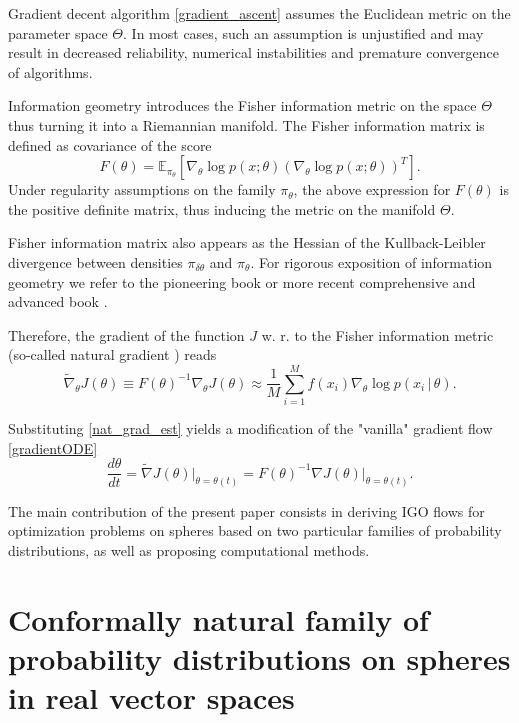 \documentclass{article}
\theoremstyle{plain}%
\theoremstyle{definition}
\theoremstyle{remark}
\theoremstyle{prop}
\begin{document}
Gradient decent algorithm \eqref{gradient_ascent} assumes the Euclidean metric on the parameter space $\Theta$. In most cases, such an assumption is unjustified and may result in decreased reliability, numerical instabilities and premature convergence of algorithms.

Information geometry introduces the Fisher information metric on the space $\Theta$ thus turning it into a Riemannian manifold. The Fisher information matrix is defined as covariance of the score 
$$
F(\theta) = \mathbb{E}_{\pi_\theta} \left[ \nabla_\theta \log p(x;\theta) (\nabla_\theta \log p(x;\theta))^T \right].
$$
Under regularity assumptions on the family $\pi_\theta$, the above expression for $F(\theta)$ is the positive definite matrix, thus inducing the metric on the manifold $\Theta$. 

Fisher information matrix also appears as the Hessian of the Kullback-Leibler divergence between densities $\pi_{\delta \theta}$ and $\pi_\theta$. For rigorous exposition of information geometry we refer to the pioneering book \cite{AN} or more recent comprehensive and advanced book \cite{AJLS}.

Therefore, the gradient of the function $J$ w. r. to the Fisher information metric (so-called natural gradient \cite{AN,AJLS}) reads
\begin{equation}
\label{nat_grad_est}
\tilde \nabla_\theta J(\theta) \equiv F(\theta)^{-1} \nabla_\theta J(\theta) \approx \frac{1}{M} \sum_{i=1}^M f(x_i) \nabla_\theta \log p(x_i \, | \, \theta).
\end{equation}

Substituting \eqref{nat_grad_est} yields a modification of the "vanilla" gradient flow \eqref{gradientODE}
\begin{equation}
\label{nat_gradientODE}
\frac{d \theta}{dt} = \tilde \nabla J(\theta) \bigg|_{\theta = \theta(t)} = F(\theta)^{-1} \nabla J(\theta) \bigg|_{\theta = \theta(t)}.
\end{equation}

The main contribution of the present paper consists in deriving IGO flows for optimization problems on spheres based on two particular families of probability distributions, as well as proposing computational methods.

\section{Conformally natural family of probability distributions on spheres in real vector spaces}
\end{document}
